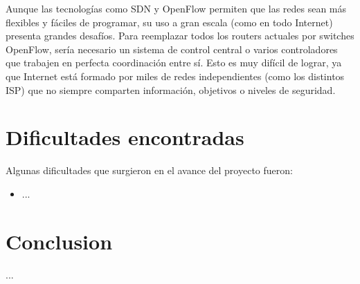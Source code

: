 \documentclass[titlepage,a4paper]{article}
\begin{document}
\begin{itemize}
        Aunque las tecnologías como SDN y OpenFlow permiten que las redes sean más flexibles y fáciles de programar, su uso a gran escala (como en todo Internet) presenta grandes desafíos. Para reemplazar todos los routers actuales por switches OpenFlow, sería necesario un sistema de control central o varios controladores que trabajen en perfecta coordinación entre sí. Esto es muy difícil de lograr, ya que Internet está formado por miles de redes independientes (como los distintos ISP) que no siempre comparten información, objetivos o niveles de seguridad.
        
        
    \end{itemize}
    
    \section{Dificultades encontradas}\label{sec:dificultadesEncontras}
    Algunas dificultades que surgieron en el avance del proyecto fueron:
    
    \begin{itemize}
        \item ...
    \end{itemize}
    
\section{Conclusion}\label{conclusion}
    ...
    
\end{document}
